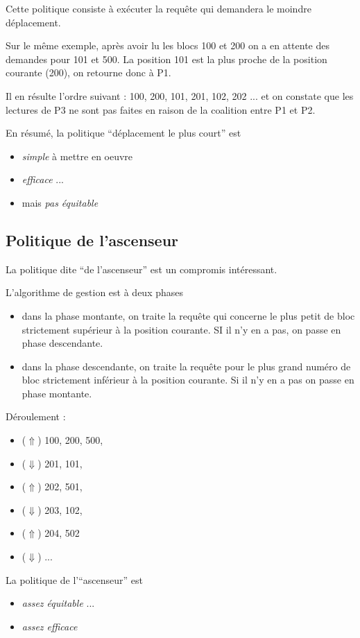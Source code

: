 \begin{multicols}{2}
Cette politique consiste à exécuter la requête qui demandera le moindre déplacement.

Sur le même exemple, après avoir lu les blocs 100 et 200 on a en attente des demandes pour 101 et 500. La position 101 est la plus proche de la position courante (200), on retourne donc à P1.

Il en résulte l'ordre suivant : 100, 200, 101, 201, 102, 202 ...
et on constate que les lectures de P3 ne sont pas faites en raison de la coalition entre P1 et P2.

En résumé, la politique ``déplacement le plus court'' est
\begin{itemize}
  \item \emph{simple} à mettre en oeuvre
 \item \emph{efficace} ...
 \item mais \emph{pas équitable}
\end{itemize}


\subsection{Politique de l'ascenseur}

La politique dite ``de l'ascenseur'' est un compromis intéressant.

L'algorithme de gestion est à deux phases
\begin{itemize}
\item dans la phase montante, on traite la requête qui concerne le plus petit
de bloc strictement supérieur à la position courante. SI il n'y en a pas, on passe en phase descendante.
\item dans la phase descendante,  on traite la requête pour le plus grand numéro de bloc strictement inférieur à la position courante. Si il n'y en a pas on passe en phase montante.
\end{itemize}

Déroulement :
\begin{itemize}
\item  ($\Uparrow$)   100,   200,   500, 
\item   ($\Downarrow$)   201,   101, 
\item   ($\Uparrow$) 202, 501,
\item    ($\Downarrow$) 203, 102,
\item   ($\Uparrow$) 204, 502  
\item ($\Downarrow$) ...
\end{itemize}


La politique de l'``ascenseur'' est 
\begin{itemize}
 \item \emph{assez équitable} ...
 \item \emph{assez efficace}
\end{itemize}



\end{multicols}
